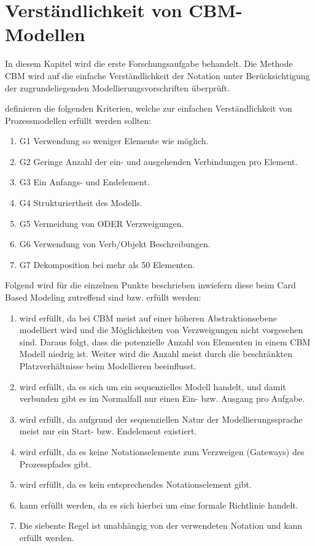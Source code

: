 %
%
% 
% 
% 

\chapter{Verständlichkeit von CBM-Modellen}
\label{cha:Empfehlungen}
In diesem Kapitel wird die erste Forschungsaufgabe behandelt. Die Methode CBM \citep{Oppl:2015:ASB:2723839.2723841} wird auf die einfache Verständlichkeit der Notation unter Berücksichtigung der zugrundeliegenden Modellierungsvorschriften überprüft.

\citeauthor{MENDLING2010127} definieren die folgenden Kriterien, welche zur einfachen Verständlichkeit von Prozessmodellen erfüllt werden sollten:
\begin{enumerate}
	\item G1 Verwendung so weniger Elemente wie möglich.
	\item G2 Geringe Anzahl der ein- und ausgehenden Verbindungen pro Element.
	\item G3 Ein Anfangs- und Endelement.
	\item G4 Strukturiertheit des Modells.
	\item G5 Vermeidung von ODER Verzweigungen.
	\item G6 Verwendung von Verb/Objekt Beschreibungen.
	\item G7 Dekomposition bei mehr als 50 Elementen.\citep{MENDLING2010127}
\end{enumerate}

Folgend wird für die einzelnen Punkte beschrieben inwiefern diese beim Card Based Modeling zutreffend sind bzw. erfüllt werden:

\begin{enumerate}
	\item wird erfüllt, da bei CBM meist auf einer höheren Abstraktionsebene modelliert wird und die Möglichkeiten von Verzweigungen nicht vorgesehen sind. Daraus folgt, dass die potenzielle Anzahl von Elementen in einem CBM Modell niedrig ist. Weiter wird die Anzahl meist durch die beschränkten Platzverhältnisse beim Modellieren beeinflusst. 
	\item wird erfüllt, da es sich um ein sequenzielles Modell handelt, und damit verbunden gibt es im Normalfall nur einen Ein- bzw. Ausgang pro Aufgabe.
	\item wird erfüllt, da aufgrund der sequenziellen Natur der Modellierungssprache meist nur ein Start- bzw. Endelement existiert.
	\item wird erfüllt, da es keine Notationselemente zum Verzweigen (Gateways) des Prozesspfades gibt. 
	\item wird erfüllt, da es kein entsprechendes Notationselement gibt. 
	\item kann erfüllt werden, da es sich hierbei um eine formale Richtlinie handelt.
	\item Die siebente Regel ist unabhängig von der verwendeten Notation und kann erfüllt werden.
\end{enumerate}

